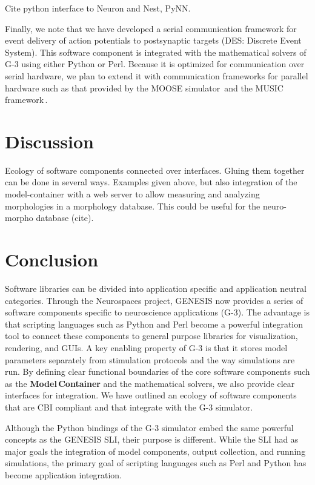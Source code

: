 \documentclass[12pt]{article}
\begin{document}
Cite python interface to Neuron and Nest, PyNN.

Finally, we note that we have developed a serial communication
framework for event delivery of action potentials to postsynaptic
targets (DES: Discrete Event System).  This software component is
integrated with the mathematical solvers of G-3 using either Python or
Perl.  Because it is optimized for communication over serial hardware,
we plan to extend it with communication frameworks for parallel
hardware such as that provided by the MOOSE
simulator\,\cite{ray08:_pymoos} and the MUSIC
framework\,\cite{ekeberg08:_music_multis_coord}.

\section{Discussion}

Ecology of software components connected over interfaces.  Gluing them
together can be done in several ways.  Examples given above, but also
integration of the model-container with a web server to allow
measuring and analyzing morphologies in a morphology database.  This
could be useful for the neuro-morpho database (cite).

\section{Conclusion}

Software libraries can be divided into application specific and
application neutral categories.  Through the Neurospaces project,
GENESIS now provides a series of software components specific to
neuroscience applications (G-3).  The advantage is that scripting
languages such as Python and Perl become a powerful integration tool
to connect these components to general purpose libraries for
visualization, rendering, and GUIs.  A key enabling property of G-3 is
that it stores model parameters separately from stimulation protocols
and the way simulations are run.  By defining clear functional
boundaries of the core software components such as the {\bf
  Model\,Container} and the mathematical solvers, we also provide
clear interfaces for integration. We have outlined an ecology of
software components that are CBI compliant and that integrate with the
G-3 simulator.

Although the Python bindings of the G-3 simulator embed the same
powerful concepts as the GENESIS SLI, their purpose is different.
While the SLI had as major goals the integration of model components,
output collection, and running simulations, the primary goal of
scripting languages such as Perl and Python has become application
integration.
\end{document}
